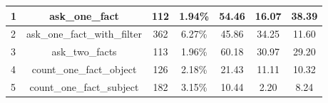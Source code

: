 \begin{table}[]
{\begin{tabular}{|l|c|cc|cc|c|}
    1                            & ask\_one\_fact                                                                                                         & 112                                                 & 1.94\%                                                                          & 54.46                                                                                                      & 16.07                                                                                  & 38.39                                                                              \\ \hline
    2                            & ask\_one\_fact\_with\_filter                                                                                           & 362                                                 & 6.27\%                                                                          & 45.86                                                                                                      & 34.25                                                                                  & 11.60                                                                              \\ \hline
    3                            & ask\_two\_facts                                                                                                        & 113                                                 & 1.96\%                                                                          & 60.18                                                                                                      & 30.97                                                                                  & 29.20                                                                              \\ \hline
    4                            & count\_one\_fact\_object                                                                                               & 126                                                 & 2.18\%                                                                          & 21.43                                                                                                      & 11.11                                                                                  & 10.32                                                                              \\ \hline
    5                            & count\_one\_fact\_subject                                                                                              & 182                                                 & 3.15\%                                                                          & 10.44                                                                                                      & 2.20                                                                                   & 8.24                                                                               \\ \hline

\end{tabular}}
\end{table}
